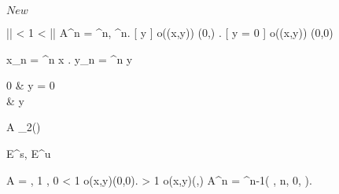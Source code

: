 \documentclass[../Main/main]{subfiles}
\begin{document}
\unit{ $ New $ }
{
	
	\proposition{ $  $ }
	{
		{
			|\lambda| < 1 < |\mu|
		}
		\holds
		{
			A^n = \lambda^n, \mu^n.
			[ y  ]
			{
				o((x,y)) \convergesto (0,\infty)
			}.
			{
				o((x,y)) \convergesto (0,0)
			}
		}
		\demonstration
		{
			x_n = \lambda^n x .
			y_n = \mu^n y \convergesto \begin{cases} 0 & y = 0 \\ \infty & y  \end{cases} 
		}
	}
	
	
	{
		{
			A \in \Mc_{2}(\R)
		}
		{
			
		}
		{

		}
		\denote
		{
			E^s, E^u
		}
	}


	{
		{
			A = \lambda, 1 \lambda, 0
		}
		\holds
		{
			\abs{ \lambda } < 1 \imp o(x,y)\convergesto (0,0).
			\abs{ \lambda } > 1 \imp o(x,y)\convergesto (\infty,\infty)			
		}
		\demonstration
		{
			A^n = \lambda^{n-1}( \lambda, n, 0, \lambda ).
		}
	}
	
	
	
	
	
	
	
}
\end{document}

